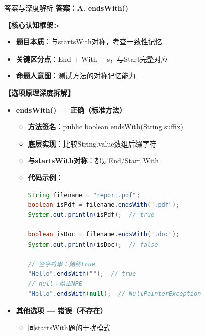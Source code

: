 \documentclass[12pt, a4paper]{ctexart}
\begin{document}
\begin{enumerate}[label=\textbf{\arabic*.}]
	      \begin{bluebox}{答案与深度解析}
		      \textbf{答案：A. endsWith()}

		      \textbf{【核心认知框架>}
		      \begin{itemize}[label={}, leftmargin=*, nosep]
			      \item \textbf{题目本质}：与startsWith对称，考查一致性记忆
			      \item \textbf{关键区分点}：End + With + s，与Start完整对应
			      \item \textbf{命题人意图}：测试方法的对称记忆能力
		      \end{itemize}

		      \textbf{【选项原理深度拆解】}

		      \begin{itemize}[leftmargin=*, nosep, label={}]
			      \item[A] \textbf{endsWith() — 正确（标准方法）}
			            \begin{itemize}[label={}, leftmargin=*, nosep]
				            \item \textbf{方法签名}：public boolean endsWith(String suffix)
				            \item \textbf{底层实现}：比较String.value数组后缀字符
				            \item \textbf{与startsWith对称}：都是End/Start With
				            \item \textbf{代码示例}：
				                  \begin{lstlisting}[language=Java]
String filename = "report.pdf";
boolean isPdf = filename.endsWith(".pdf");
System.out.println(isPdf);  // true

boolean isDoc = filename.endsWith(".doc");
System.out.println(isDoc);  // false

// 空字符串：始终true
"Hello".endsWith("");  // true
// null：抛出NPE
"Hello".endsWith(null);  // NullPointerException
				            \end{lstlisting}
			            \end{itemize}

			      \item[B/C/D] \textbf{其他选项 — 错误（不存在）}
			            \begin{itemize}[label={}, leftmargin=*, nosep]
				            \item 同startsWith题的干扰模式
			            \end{itemize}
		      \end{itemize}


\end{bluebox}
\end{enumerate}
\end{document}
